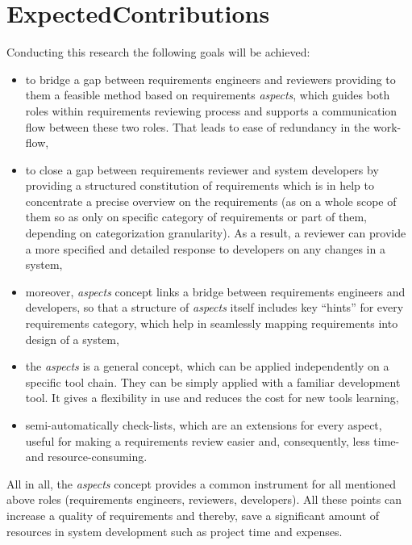 \section{ExpectedContributions}
Conducting this research the following goals will be achieved:
\begin{itemize}
\item	to bridge a gap between requirements engineers and reviewers providing to them a feasible method based on requirements \textit{aspects}, which guides both roles within requirements reviewing process and supports a communication flow between these two roles. That leads to ease of redundancy in the work-flow,
\item	to close a gap between requirements reviewer and system developers by providing a structured constitution of requirements which is in help to concentrate a precise overview on the requirements (as on a whole scope of them so as only on specific category of requirements or part of them, depending on categorization granularity). As a result, a reviewer can provide a more specified and detailed response to developers on any changes in a system,
\item	moreover, \textit{aspects} concept links a bridge between requirements engineers and developers, so that a structure of \textit{aspects} itself includes key “hints” for every requirements category, which help in seamlessly mapping requirements into design of a system,
\item	the \textit{aspects} is a general concept, which can be applied independently on a specific tool chain. They can be simply applied with a familiar development tool. It gives a flexibility in use and reduces the cost for new tools learning,
\item	semi-automatically check-lists, which are an extensions for every aspect, useful for making a requirements review easier and, consequently, less time- and resource-consuming.
\end{itemize}
All in all, the \textit{aspects} concept provides a common instrument for all mentioned above roles (requirements engineers, reviewers, developers). All these points can increase a quality of requirements and thereby, save a significant amount of resources in system development such as project time and expenses.
